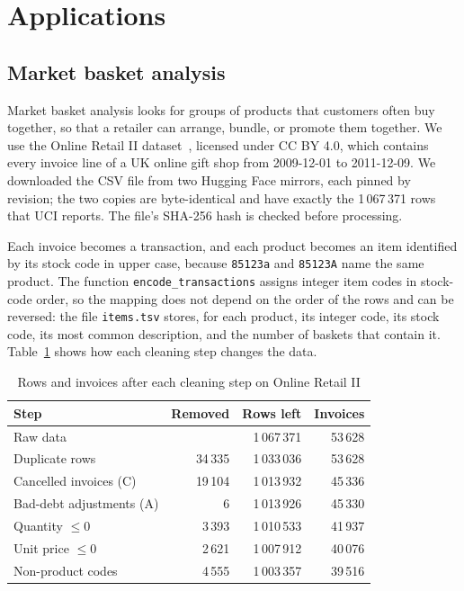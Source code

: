 \section{Applications}
\label{sec:applications}
\subsection{Market basket analysis}
\label{sec:basket}
Market basket analysis looks for groups of products that customers often buy together, so
that a retailer can arrange, bundle, or promote them together. We use the Online Retail II
dataset~\cite{chen2012}, licensed under CC BY 4.0, which contains every invoice line of a
UK online gift shop from 2009-12-01 to 2011-12-09. We downloaded the CSV file from two
Hugging Face mirrors, each pinned by revision; the two copies are byte-identical and have
exactly the 1\,067\,371 rows that UCI reports. The file's SHA-256 hash is checked before
processing.

Each invoice becomes a transaction, and each product becomes an item identified by its
stock code in upper case, because \texttt{85123a} and \texttt{85123A} name the same
product. The function \texttt{encode\_transactions} assigns integer item codes in
stock-code order, so the mapping does not depend on the order of the rows and can be
reversed: the file \texttt{items.tsv} stores, for each product, its integer code, its stock
code, its most common description, and the number of baskets that contain it.
Table~\ref{tab:basket-cleaning} shows how each cleaning step changes the data.

\begin{table}[t]
\centering
\caption{Rows and invoices after each cleaning step on Online Retail II}
\label{tab:basket-cleaning}
\begin{tabular}{lrrr}
\hline
Step & Removed & Rows left & Invoices \\
\hline
Raw data & & 1\,067\,371 & 53\,628 \\
Duplicate rows & 34\,335 & 1\,033\,036 & 53\,628 \\
Cancelled invoices (C) & 19\,104 & 1\,013\,932 & 45\,336 \\
Bad-debt adjustments (A) & 6 & 1\,013\,926 & 45\,330 \\
Quantity $\le 0$ & 3\,393 & 1\,010\,533 & 41\,937 \\
Unit price $\le 0$ & 2\,621 & 1\,007\,912 & 40\,076 \\
Non-product codes & 4\,555 & 1\,003\,357 & 39\,516 \\
\hline
\end{tabular}
\end{table}


